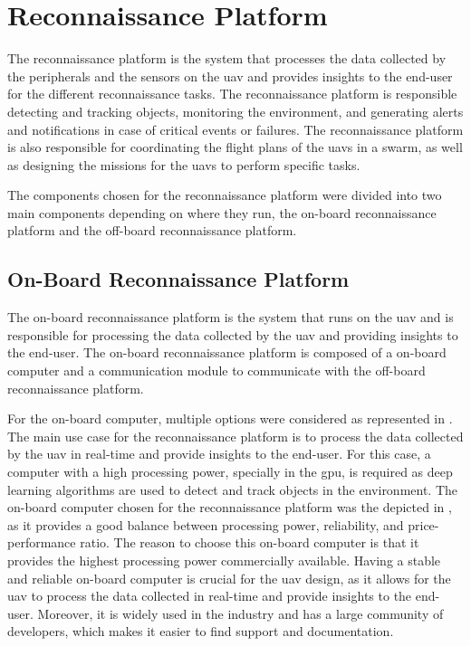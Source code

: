 \section{Reconnaissance Platform}\label{sec:reconnaissance_platform}

The reconnaissance platform is the system that processes the data collected by the peripherals and the sensors on the \gls{uav} and provides insights to the end-user for the different reconnaissance tasks. The reconnaissance platform is responsible detecting and tracking objects, monitoring the environment, and generating alerts and notifications in case of critical events or failures. The reconnaissance platform is also responsible for coordinating the flight plans of the \glspl{uav} in a swarm, as well as designing the missions for the \glspl{uav} to perform specific tasks.

The components chosen for the reconnaissance platform were divided into two main components depending on where they run, the on-board reconnaissance platform and the off-board reconnaissance platform.

\subsection{On-Board Reconnaissance Platform}\label{subsec:on-board_reconnaissance_platform}

The on-board reconnaissance platform is the system that runs on the \gls{uav} and is responsible for processing the data collected by the \gls{uav} and providing insights to the end-user. The on-board reconnaissance platform is composed of a on-board computer and a communication module to communicate with the off-board reconnaissance platform.

For the on-board computer, multiple options were considered as represented in . The main use case for the reconnaissance platform is to process the data collected by the \gls{uav} in real-time and provide insights to the end-user. For this case, a computer with a high processing power, specially in the \gls{gpu}, is required as deep learning algorithms are used to detect and track objects in the environment. The on-board computer chosen for the reconnaissance platform was the  depicted in , as it provides a good balance between processing power, reliability, and price-performance ratio. The reason to choose this on-board computer is that it provides the highest processing power commercially available. Having a stable and reliable on-board computer is crucial for the \gls{uav} design, as it allows for the \gls{uav} to process the data collected in real-time and provide insights to the end-user. Moreover, it is widely used in the industry and has a large community of developers, which makes it easier to find support and documentation.


